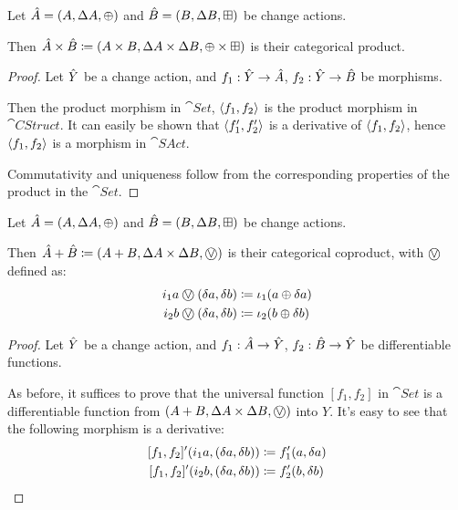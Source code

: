 \begin{prop}[Products]
  Let $\hat{A} = (A,\Delta A,\oplus)$ and $\hat{B} =
  (B,\Delta B,\boxplus)$ be change actions.

  Then $\hat{A} \times \hat{B} \coloneqq (A \times B,\Delta A \times
  \Delta B,\oplus \times \boxplus)$ is their categorical product.
\end{prop}
\ifproofs
\begin{proof}
  Let $\hat{Y}$ be a change action, and $f_1: \hat{Y} \rightarrow \hat{A}$, $f_2: \hat{Y}
  \rightarrow \hat{B}$ be morphisms.

  Then the product morphism in $\cat{Set}$, $\left\langle {f_1}, {f_2} \right\rangle$ is the product
  morphism in $\cat{CStruct}$. It can easily be
  shown that $\left\langle {f_1'}, {f_2'} \right\rangle$ is a derivative of $\left\langle {f_1}, {f_2} \right\rangle$,
  hence $\left\langle {f_1}, {f_2} \right\rangle$ is a morphism in $\cat{SAct}$.

  Commutativity and uniqueness follow from the corresponding properties of the
  product in the $\cat{Set}$.
\end{proof}
\fi

\begin{prop}[Coproducts]
  Let $\hat{A} = (A,\Delta A,\oplus)$ and $\hat{B} =
  (B,\Delta B,\boxplus)$ be change actions.

  Then $\cstr{A} + \cstr{B} \defeq \cstruct{A + B}{\changes{A} \times
  \changes{B}}{\cplusvee}$ is their categorical coproduct, with $\cplusvee$ defined as:
  \begin{align*}
    i_1 a \cplusvee (\change{a}, \change{b}) &\defeq \iota_1 (a \cplus \change{a})\\
    i_2 b \cplusvee (\change{a}, \change{b}) &\defeq \iota_2 (b \cplus \change{b})
  \end{align*}
\end{prop}
\ifproofs
\begin{proof}
  Let $\hat{Y}$ be a change action, and $f_1 : \hat{A} \rightarrow \hat{Y}$, $f_2 : \hat{B}
  \rightarrow \hat{Y}$ be differentiable functions.

  As before, it suffices to prove that the universal function $[f_1, f_2]$ in $\cat{Set}$ is a differentiable
  function from $\cstruct{A + B}{\changes{A} \times \changes{B}}{\cplusvee}$ into $Y$. It's easy to see
  that the following morphism is a derivative:
  \begin{align*}
    \derive{[f_1, f_2]} (i_1 a, (\change{a}, \change{b})) &\defeq f_1'(a, \change{a})\\
    \derive{[f_1, f_2]} (i_2 b, (\change{a}, \change{b})) &\defeq f_2'(b, \change{b})
  \end{align*}
\end{proof}
\fi

